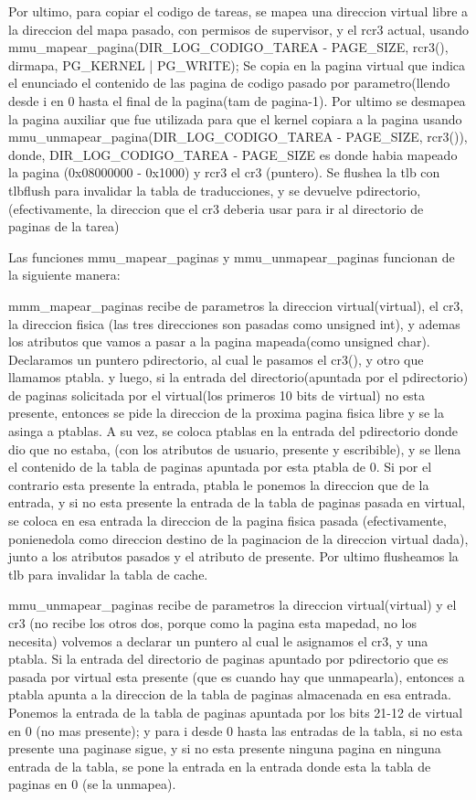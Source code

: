 \documentclass[a4paper]{article}
\begin{document}
Por ultimo, para copiar el codigo de tareas, se mapea una direccion virtual libre a la direccion del mapa pasado, con permisos de supervisor, y el rcr3 actual, usando mmu_mapear_pagina(DIR_LOG_CODIGO_TAREA - PAGE_SIZE, rcr3(), dirmapa, PG_KERNEL | PG_WRITE);  
Se copia en la pagina virtual que indica el enunciado el contenido de las pagina de codigo pasado por parametro(llendo desde i en  0 hasta el final de la pagina(tam de pagina-1). 
Por ultimo se desmapea la pagina auxiliar que fue utilizada para que el kernel copiara a la pagina usando mmu_unmapear_pagina(DIR_LOG_CODIGO_TAREA - PAGE_SIZE, rcr3()), donde,  DIR_LOG_CODIGO_TAREA - PAGE_SIZE es donde habia mapeado la pagina (0x08000000 - 0x1000) y rcr3 el cr3 (puntero).
Se flushea la tlb con tlbflush para invalidar la tabla de traducciones, y se devuelve pdirectorio, (efectivamente, la direccion que el cr3 deberia usar para ir al directorio de paginas de la tarea)



Las funciones mmu_mapear_paginas y mmu_unmapear_paginas funcionan de la siguiente manera:

mmm_mapear_paginas recibe de parametros  la direccion virtual(virtual), el cr3, la direccion fisica (las tres direcciones son pasadas como unsigned int), y ademas los atributos que vamos a pasar a la pagina mapeada(como unsigned char).
Declaramos un puntero pdirectorio, al cual le pasamos el cr3(), y otro que llamamos ptabla. y luego, si la entrada del directorio(apuntada por el pdirectorio) de paginas solicitada por el virtual(los primeros 10 bits de virtual) no esta presente, entonces se pide la direccion de la proxima pagina fisica libre y se la asinga a ptablas. A su vez, se coloca ptablas en la entrada del pdirectorio donde dio que no estaba, (con los atributos de usuario, presente y escribible), y se llena el contenido de la tabla de paginas apuntada por esta ptabla de 0.
Si por el contrario esta presente la entrada, ptabla le ponemos la direccion que de la entrada, y si no esta presente la entrada de la tabla de paginas pasada en virtual, se coloca en esa entrada la direccion de la pagina fisica pasada (efectivamente, ponienedola como direccion destino de la paginacion de la direccion virtual dada), junto a los atributos pasados y el atributo de presente.
Por ultimo flusheamos la tlb para invalidar la tabla de cache.

mmu_unmapear_paginas recibe de parametros  la direccion virtual(virtual) y el cr3 (no recibe los otros dos, porque como la pagina esta mapedad, no los necesita)
volvemos a declarar un puntero al cual le asignamos el cr3, y una ptabla. Si la entrada  del directorio de paginas apuntado por pdirectorio que es pasada por virtual esta presente (que es cuando hay que unmapearla), entonces a ptabla apunta a la direccion de la tabla de paginas almacenada en esa entrada.
Ponemos la entrada de la tabla de paginas apuntada por los bits 21-12 de virtual en 0 (no mas presente); y para i desde 0 hasta las entradas de la tabla, si no esta presente una paginase sigue, y si no esta presente ninguna pagina en ninguna entrada de la tabla, se pone la entrada en la entrada donde esta la tabla de paginas en 0 (se la unmapea). 
\end{document}
